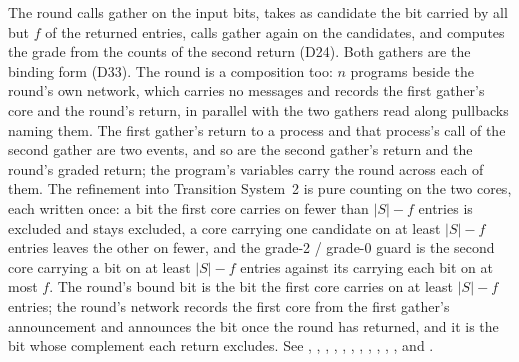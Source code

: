 The round calls gather on the input bits, takes as candidate the bit carried by all but $f$ of the returned entries, calls gather again on the candidates, and computes the grade from the counts of the second return (D24).
Both gathers are the binding form (D33).
The round is a composition too: $n$ programs beside the round's own network, which carries no messages and records the first gather's core and the round's return, in parallel with the two gathers read along pullbacks naming them.
The first gather's return to a process and that process's call of the second gather are two events, and so are the second gather's return and the round's graded return; the program's variables carry the round across each of them.
The refinement into Transition System~2 is pure counting on the two cores, each written once: a bit the first core carries on fewer than $|S| - f$ entries is excluded and stays excluded, a core carrying one candidate on at least $|S| - f$ entries leaves the other on fewer, and the grade-2 / grade-0 guard is the second core carrying a bit on at least $|S| - f$ entries against its carrying each bit on at most $f$.
The round's bound bit is the bit the first core carries on at least $|S| - f$ entries; the round's network records the first core from the first gather's announcement and announces the bit once the round has returned, and it is the bit whose complement each return excludes.
See , , , , , , , , , , ,  and .







